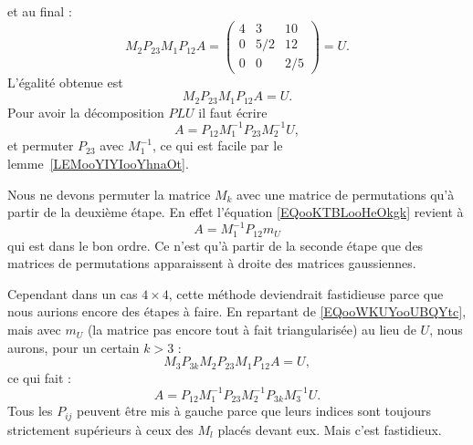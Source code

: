 et au final :
\begin{equation}
    M_2P_{23}M_1P_{12}A=\begin{pmatrix}
        4    &   3    &   10    \\
        0    &   5/2    &   12    \\
        0    &   0    &   2/5
    \end{pmatrix}=U.
\end{equation}
L'égalité obtenue est
\begin{equation}
    M_2P_{23}M_1P_{12}A=U.
\end{equation}
Pour avoir la décomposition \( PLU\) il faut écrire
\begin{equation}        \label{EQooWKUYooUBQYtc}
    A=P_{12}M_1^{-1}P_{23}M_2^{-1}U,
\end{equation}
et permuter \( P_{23}\) avec \( M_1^{-1}\), ce qui est facile par le lemme~\ref{LEMooYIYIooYhnaOt}.

\begin{remark}
    Nous ne devons permuter la matrice \( M_k\) avec une matrice de permutations qu'à partir de la deuxième étape. En effet l'équation \eqref{EQooKTBLooHeOkgk} revient à
    \begin{equation}
        A=M_1^{-1}P_{12}m_U
    \end{equation}
    qui est dans le bon ordre. Ce n'est qu'à partir de la seconde étape que des matrices de permutations apparaissent à droite des matrices gaussiennes.
\end{remark}

Cependant dans un cas \( 4\times 4\), cette méthode deviendrait fastidieuse parce que nous aurions encore des étapes à faire. En repartant de \eqref{EQooWKUYooUBQYtc}, mais avec \( m_U\) (la matrice pas encore tout à fait triangularisée) au lieu de \( U\), nous aurons, pour un certain \( k>3\) :
\begin{equation}
    M_3P_{3k}M_2P_{23}M_1P_{12}A=U,
\end{equation}
ce qui fait :
\begin{equation}
    A=P_{12}M_1^{-1}P_{23}M_2^{-1}P_{3k}M_3^{-1}U.
\end{equation}
Tous les \( P_{ij}\) peuvent être mis à gauche parce que leurs indices sont toujours strictement supérieurs à ceux des \( M_l\) placés devant eux. Mais c'est fastidieux.

